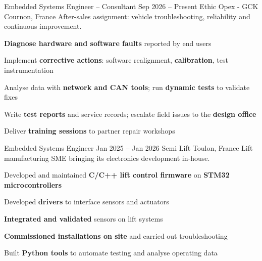 \documentclass[10pt]{article}
\begin{document}
\begin{cvmain}



\begin{cvtimeline}

\cvexperience
  {Embedded Systems Engineer -- Consultant}
  {Sep 2026 -- Present}
  {Ethic Opex - GCK}
  {Cournon, France}
  {After-sales assignment: vehicle troubleshooting, reliability and continuous improvement.}
\begin{cvitems}
  \item \textbf{Diagnose hardware and software faults} reported by end users
  \item Implement \textbf{corrective actions}: software realignment, \textbf{calibration}, test instrumentation
  \item Analyse data with \textbf{network and CAN tools}; run \textbf{dynamic tests} to validate fixes
  \item Write \textbf{test reports} and service records; escalate field issues to the \textbf{design office}
  \item Deliver \textbf{training sessions} to partner repair workshops
\end{cvitems}

\cvsep
\cvexperience
  {Embedded Systems Engineer}
  {Jan 2025 -- Jan 2026}
  {Semi Lift}
  {Toulon, France}
  {Lift manufacturing SME bringing its electronics development in-house.}
\begin{cvitems}
  \item Developed and maintained \textbf{C/C++ lift control firmware} on \textbf{STM32 microcontrollers}
  \item Developed \textbf{drivers} to interface sensors and actuators
  \item \textbf{Integrated and validated} sensors on lift systems
  \item \textbf{Commissioned installations on site} and carried out troubleshooting
  \item Built \textbf{Python tools} to automate testing and analyse operating data
\end{cvitems}


\end{cvtimeline}
\end{cvmain}
\end{document}
